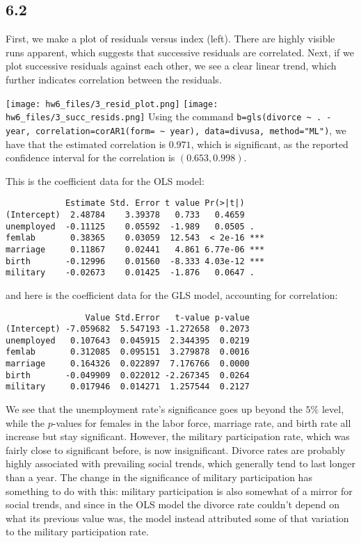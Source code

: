 \documentclass{article}
\begin{document}
\subsection*{6.2}
First, we make a plot of residuals versus index (left). There are highly visible runs apparent, which suggests that successive residuals are correlated. Next, if we plot successive residuals against each other, we see a clear linear trend, which further indicates correlation between the residuals.

\texttt{[image: hw6\_files/3\_resid\_plot.png]}
\texttt{[image: hw6\_files/3\_succ\_resids.png]}
Using the command \verb|b=gls(divorce ~ . - year, correlation=corAR1(form= ~ year), data=divusa, method="ML")|, we have that the estimated correlation is $0.971$, which is significant, as the reported confidence interval for the correlation is $(0.653, 0.998)$. 

This is the coefficient data for the OLS model:
\begin{verbatim}
            Estimate Std. Error t value Pr(>|t|)    
(Intercept)  2.48784    3.39378   0.733   0.4659    
unemployed  -0.11125    0.05592  -1.989   0.0505 .  
femlab       0.38365    0.03059  12.543  < 2e-16 ***
marriage     0.11867    0.02441   4.861 6.77e-06 ***
birth       -0.12996    0.01560  -8.333 4.03e-12 ***
military    -0.02673    0.01425  -1.876   0.0647 .  
\end{verbatim}
and here is the coefficient data for the GLS model, accounting for correlation:
\begin{verbatim}
                Value Std.Error   t-value p-value
(Intercept) -7.059682  5.547193 -1.272658  0.2073
unemployed   0.107643  0.045915  2.344395  0.0219
femlab       0.312085  0.095151  3.279878  0.0016
marriage     0.164326  0.022897  7.176766  0.0000
birth       -0.049909  0.022012 -2.267345  0.0264
military     0.017946  0.014271  1.257544  0.2127
\end{verbatim}
We see that the unemployment rate's significance goes up beyond the $5\%$ level, while the $p$-values for females in the labor force, marriage rate, and birth rate all increase but stay significant. However, the military participation rate, which was fairly close to significant before, is now insignificant.
Divorce rates are probably highly associated with prevailing social trends, which generally tend to last longer than a year. The change in the significance of military participation has something to do with this: military participation is also somewhat of a mirror for social trends, and since in the OLS model the divorce rate couldn't depend on what its previous value was, the model instead attributed some of that variation to the military participation rate.
\end{document}
